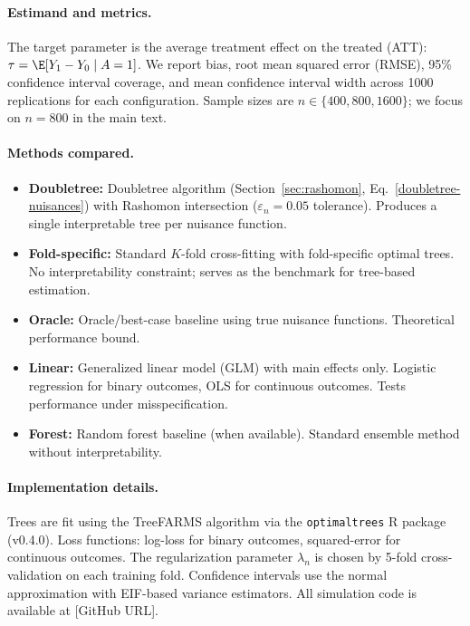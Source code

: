\documentclass[12pt]{article}
\begin{document}
\paragraph{Estimand and metrics.}
The target parameter is the average treatment effect on the treated (ATT): $\tau = \E[Y_1 - Y_0 \mid A = 1]$. We report bias, root mean squared error (RMSE), 95\% confidence interval coverage, and mean confidence interval width across 1000 replications for each configuration. Sample sizes are $n \in \{400, 800, 1600\}$; we focus on $n = 800$ in the main text.

\paragraph{Methods compared.}
\begin{itemize}[nosep]
\item \textbf{Doubletree:} Doubletree algorithm (Section~\ref{sec:rashomon}, Eq.~\eqref{doubletree-nuisances}) with Rashomon intersection ($\varepsilon_n = 0.05$ tolerance). Produces a single interpretable tree per nuisance function.
\item \textbf{Fold-specific:} Standard $K$-fold cross-fitting with fold-specific optimal trees. No interpretability constraint; serves as the benchmark for tree-based estimation.
\item \textbf{Oracle:} Oracle/best-case baseline using true nuisance functions. Theoretical performance bound.
\item \textbf{Linear:} Generalized linear model (GLM) with main effects only. Logistic regression for binary outcomes, OLS for continuous outcomes. Tests performance under misspecification.
\item \textbf{Forest:} Random forest baseline (when available). Standard ensemble method without interpretability.
\end{itemize}

\paragraph{Implementation details.}
Trees are fit using the TreeFARMS algorithm via the \texttt{optimaltrees} R package (v0.4.0). Loss functions: log-loss for binary outcomes, squared-error for continuous outcomes. The regularization parameter $\lambda_n$ is chosen by 5-fold cross-validation on each training fold. Confidence intervals use the normal approximation with EIF-based variance estimators. All simulation code is available at [GitHub URL].
\end{document}
